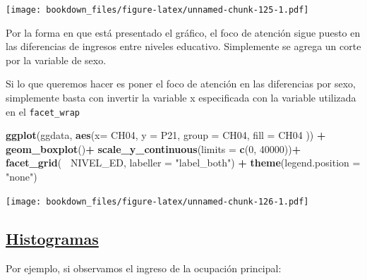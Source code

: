 \documentclass[]{book}
\newenvironment{Shaded}{\begin{snugshade}}{\end{snugshade}}
\newcommand{\DataTypeTok}[1]{\textcolor[rgb]{0.13,0.29,0.53}{#1}}
\newcommand{\DecValTok}[1]{\textcolor[rgb]{0.00,0.00,0.81}{#1}}
\newcommand{\KeywordTok}[1]{\textcolor[rgb]{0.13,0.29,0.53}{\textbf{#1}}}
\newcommand{\NormalTok}[1]{#1}
\newcommand{\OperatorTok}[1]{\textcolor[rgb]{0.81,0.36,0.00}{\textbf{#1}}}
\newcommand{\StringTok}[1]{\textcolor[rgb]{0.31,0.60,0.02}{#1}}
\begin{document}
\texttt{[image: bookdown\_files/figure-latex/unnamed-chunk-125-1.pdf]}

Por la forma en que está presentado el gráfico, el foco de atención sigue puesto en las diferencias de ingresos entre niveles educativo. Simplemente se agrega un corte por la variable de sexo.

Si lo que queremos hacer es poner el foco de atención en las diferencias por sexo, simplemente basta con invertir la variable x especificada con la variable utilizada en el \texttt{facet\_wrap}

\begin{Shaded}
\begin{Highlighting}[]
\KeywordTok{ggplot}\NormalTok{(ggdata, }\KeywordTok{aes}\NormalTok{(}\DataTypeTok{x=}\NormalTok{ CH04, }\DataTypeTok{y =}\NormalTok{ P21, }\DataTypeTok{group =}\NormalTok{ CH04, }\DataTypeTok{fill =}\NormalTok{ CH04 )) }\OperatorTok{+}
\StringTok{  }\KeywordTok{geom_boxplot}\NormalTok{()}\OperatorTok{+}
\StringTok{  }\KeywordTok{scale_y_continuous}\NormalTok{(}\DataTypeTok{limits =} \KeywordTok{c}\NormalTok{(}\DecValTok{0}\NormalTok{, }\DecValTok{40000}\NormalTok{))}\OperatorTok{+}
\StringTok{  }\KeywordTok{facet_grid}\NormalTok{(}\OperatorTok{~}\StringTok{ }\NormalTok{NIVEL_ED, }\DataTypeTok{labeller =} \StringTok{"label_both"}\NormalTok{) }\OperatorTok{+}
\StringTok{  }\KeywordTok{theme}\NormalTok{(}\DataTypeTok{legend.position =} \StringTok{"none"}\NormalTok{)}
\end{Highlighting}
\end{Shaded}

\texttt{[image: bookdown\_files/figure-latex/unnamed-chunk-126-1.pdf]}

\hypertarget{histogramas}{%
\subsection{\texorpdfstring{\href{https://ggplot2.tidyverse.org/reference/geom_histogram.html}{Histogramas}}{Histogramas}}\label{histogramas}}

Por ejemplo, si observamos el ingreso de la ocupación principal:

\begin{Shaded}
\end{Shaded}
\end{document}
